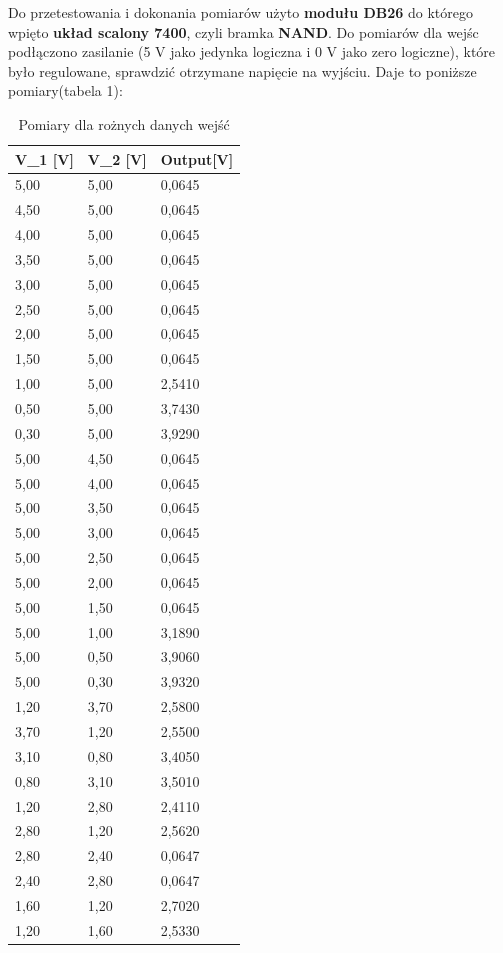 \documentclass{article}
\begin{document}
Do przetestowania i dokonania pomiarów użyto \textbf{modułu DB26} do którego wpięto \textbf{układ scalony 7400}, czyli bramka \textbf{NAND}. Do pomiarów dla wejśc podłączono zasilanie (5 V jako jedynka logiczna i 0 V jako zero logiczne), które było regulowane, sprawdzić otrzymane napięcie na wyjściu. Daje to poniższe pomiary(tabela 1):
\pagebreak
\begin{table}[!ht]
    \centering
    \caption{Pomiary dla rożnych danych wejść}
    \begin{tabular}{|l|l|l|}
    \hline
        V\_1 [V] & V\_2 [V] & Output[V] \\ \hline
        5,00 & 5,00 & 0,0645 \\ \hline
        4,50 & 5,00 & 0,0645 \\ \hline
        4,00 & 5,00 & 0,0645 \\ \hline
        3,50 & 5,00 & 0,0645 \\ \hline
        3,00 & 5,00 & 0,0645 \\ \hline
        2,50 & 5,00 & 0,0645 \\ \hline
        2,00 & 5,00 & 0,0645 \\ \hline
        1,50 & 5,00 & 0,0645 \\ \hline
        1,00 & 5,00 & 2,5410 \\ \hline
        0,50 & 5,00 & 3,7430 \\ \hline
        0,30 & 5,00 & 3,9290 \\ \hline
        5,00 & 4,50 & 0,0645 \\ \hline
        5,00 & 4,00 & 0,0645 \\ \hline
        5,00 & 3,50 & 0,0645 \\ \hline
        5,00 & 3,00 & 0,0645 \\ \hline
        5,00 & 2,50 & 0,0645 \\ \hline
        5,00 & 2,00 & 0,0645 \\ \hline
        5,00 & 1,50 & 0,0645 \\ \hline
        5,00 & 1,00 & 3,1890 \\ \hline
        5,00 & 0,50 & 3,9060 \\ \hline
        5,00 & 0,30 & 3,9320 \\ \hline
        1,20 & 3,70 & 2,5800 \\ \hline
        3,70 & 1,20 & 2,5500 \\ \hline
        3,10 & 0,80 & 3,4050 \\ \hline
        0,80 & 3,10 & 3,5010 \\ \hline
        1,20 & 2,80 & 2,4110 \\ \hline
        2,80 & 1,20 & 2,5620 \\ \hline
        2,80 & 2,40 & 0,0647 \\ \hline
        2,40 & 2,80 & 0,0647 \\ \hline
        1,60 & 1,20 & 2,7020 \\ \hline
        1,20 & 1,60 & 2,5330 \\ \hline
    \end{tabular}
\end{table}
\pagebreak
\end{document}
